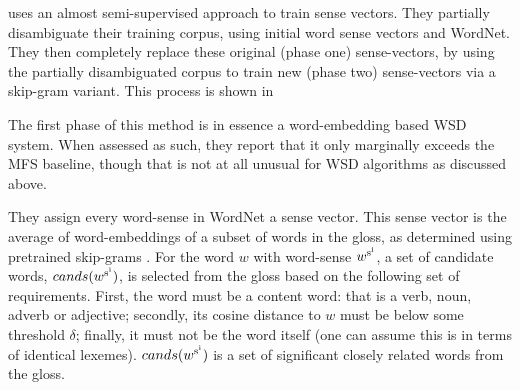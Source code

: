 \documentclass[12pt,parskip]{komatufte}
\begin{document}
\textcite{Chen2014} uses an almost semi-supervised approach to train sense vectors.
They partially disambiguate their training corpus, using initial word sense vectors and WordNet.
They then completely replace these original (phase one) sense-vectors, by using the partially disambiguated corpus to train new (phase two) sense-vectors via a skip-gram variant.
This process is shown in 


The first phase of this method is in essence a word-embedding based WSD system.
When assessed as such, they report that it only marginally exceeds the MFS baseline,
though that is not at all unusual for WSD algorithms as discussed above.

They assign every word-sense in WordNet a sense vector.
This sense vector is the average of word-embeddings of a subset of words in the gloss,
as determined using pretrained skip-grams \parencite{mikolov2013efficient}.
For the word $w$ with word-sense $\d w_{\n s_i}$,
a set of candidate words, $cands(\d w_{\n s_i})$, is selected from the gloss 
based on the following set of requirements.
First, the word must be a content word: that is a verb, noun, adverb or adjective;
secondly, its cosine distance to $w$ must be below some threshold $\delta$;
finally, it must not be the word itself (one can assume this is in terms of identical lexemes).
$cands(\d w_{\n s_i})$ is a set of significant closely related words from the gloss.

\end{document}
